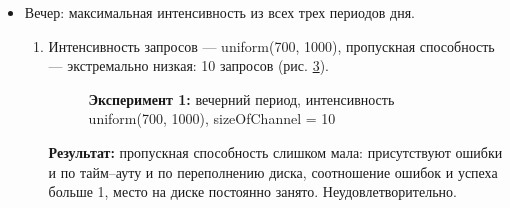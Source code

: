 \begin{itemize}
\begin{enumerate}
        \newpage
        \item Интенсивность запросов та же --- uniform(500, 700), пропускная способность --- оптимальная:
        115 запросов (рис. \ref{aft3}).
        \begin{figure} [h]
            \caption{\textbf{Эксперимент 3:} дневной период, интенсивность uniform(500, 700), sizeOfChannel = 115}
            \label{aft3}
        \end{figure}
        \textbf{Результат:} пропускная способность оптимальна, после заполнения
        есть моменты когда диск немного освобождается, ошибок по тайм--ауту нет, соотношение ошибок и успехов ---
        в районе 1 процента. Результат удовлетворяет оптимальным условиям.

        \newpage
        \item Интенсивность запросов та же --- uniform(500, 700), пропускная способность --- слишком высокая:
        120 запросов (рис. \ref{aft4}).
        \begin{figure} [h]
            \caption{\textbf{Эксперимент 4:} дневной период, интенсивность uniform(500, 700), sizeOfChannel = 120}
            \label{aft4}
        \end{figure}
        \textbf{Результат:} пропускная способность слишком высока, место на диске совсем
        не используется, ошибок не происходит. Не удовлетворительно, поскольку примерно тех же результатов можно
        достичь с меньшей пропускной способностью.
    \end{enumerate}

    \item Вечер: максимальная интенсивность из всех трех периодов дня.
     \begin{enumerate}
        \item Интенсивность запросов --- uniform(700, 1000), пропускная способность --- экстремально низкая:
        10 запросов (рис. \ref{evn1}).
        \begin{figure} [h]
            \caption{\textbf{Эксперимент 1:} вечерний период, интенсивность uniform(700, 1000), sizeOfChannel = 10}
            \label{evn1}
        \end{figure}
        \textbf{Результат:} пропускная способность слишком мала: присутствуют
        ошибки и по тайм--ауту и по переполнению диска, соотношение ошибок и успеха больше 1, место на диске
        постоянно занято. Неудовлетворительно.


\end{enumerate}
\end{itemize}
